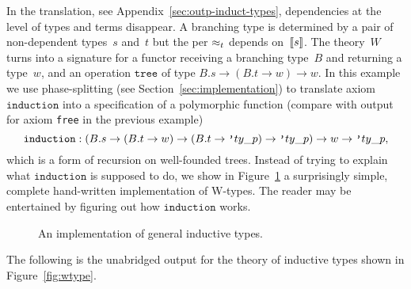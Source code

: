 In the translation, see Appendix~\ref{sec:outp-induct-types},
dependencies at the level of types and terms disappear. A branching
type is determined by a pair of non-dependent types~$s$ and~$t$ but
the per $\approx_t$ depends on~$[\![s]\!]$. The theory~$W$ turns into a
signature for a functor receiving a branching type~$B$ and returning a
type~$w$, and an operation $\mathtt{tree}$ of type $B.s \to (B.t \to
w) \to w$. In this example we use phase-splitting (see
Section~\ref{sec:implementation}) to translate axiom
$\mathtt{induction}$ into a specification of a polymorphic function
(compare with output for axiom \texttt{free} in the previous example)
%
\begin{equation*}
  \mathtt{induction}:
  (B.s \to (B.t \to w) \to (B.t \to \poly{ty\_p}) \to \poly{ty\_p}) \to w \to \poly{ty\_p},
\end{equation*}
%
which is a form of recursion on well-founded trees. Instead of trying
to explain what $\mathtt{induction}$ is supposed to do, we show in
Figure~\ref{fig:wtype-implementation} a surprisingly simple, complete
hand-written implementation of W-types. The reader may be entertained
by figuring out how $\mathtt{induction}$ works.
%
\begin{figure}
  \centering
  \caption{An implementation of general inductive types.}
  \label{fig:wtype-implementation}
\end{figure}

The following is the unabridged output for the theory of inductive
types shown in Figure~\ref{fig:wtype}.


